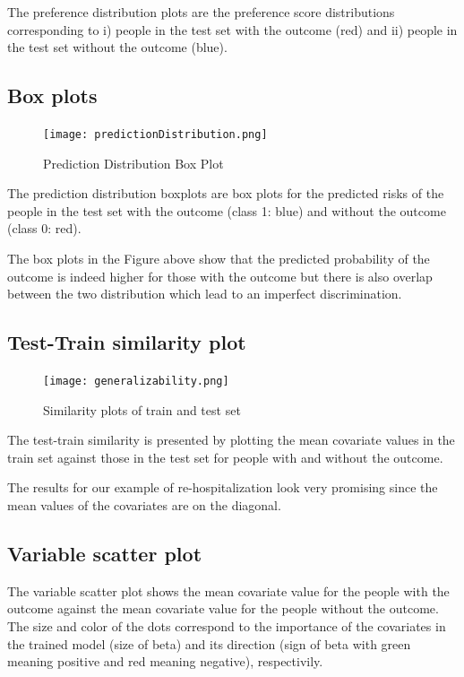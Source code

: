 \documentclass[]{article}
\begin{document}
The preference distribution plots are the preference score distributions
corresponding to i) people in the test set with the outcome (red) and
ii) people in the test set without the outcome (blue).

\newpage

\subsection{Box plots}\label{box-plots}

\begin{figure}
\centering
\texttt{[image: predictionDistribution.png]}
\caption{Prediction Distribution Box Plot}
\end{figure}

The prediction distribution boxplots are box plots for the predicted
risks of the people in the test set with the outcome (class 1: blue) and
without the outcome (class 0: red).

The box plots in the Figure above show that the predicted probability of
the outcome is indeed higher for those with the outcome but there is
also overlap between the two distribution which lead to an imperfect
discrimination.

\newpage

\subsection{Test-Train similarity
plot}\label{test-train-similarity-plot}

\begin{figure}
\centering
\texttt{[image: generalizability.png]}
\caption{Similarity plots of train and test set}
\end{figure}

The test-train similarity is presented by plotting the mean covariate
values in the train set against those in the test set for people with
and without the outcome.

The results for our example of re-hospitalization look very promising
since the mean values of the covariates are on the diagonal.

\newpage

\subsection{Variable scatter plot}\label{variable-scatter-plot}

The variable scatter plot shows the mean covariate value for the people
with the outcome against the mean covariate value for the people without
the outcome. The size and color of the dots correspond to the importance
of the covariates in the trained model (size of beta) and its direction
(sign of beta with green meaning positive and red meaning negative),
respectivily.
\end{document}

